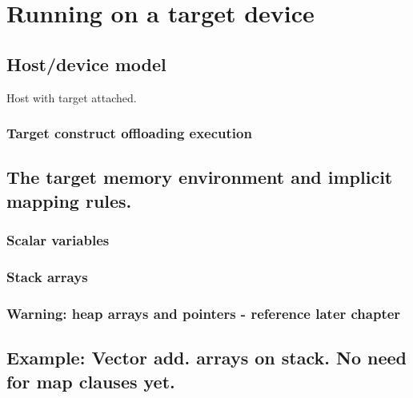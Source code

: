 
\chapter{Running on a target device}
\section{Host/device model}
Host with target attached.
\subsection{Target construct offloading execution}

\section{The target memory environment and implicit mapping rules.}
\subsection{Scalar variables}
\subsection{Stack arrays}
\subsection{Warning: heap arrays and pointers - reference later chapter}

\section{Example: Vector add. arrays on stack. No need for map clauses yet.}

